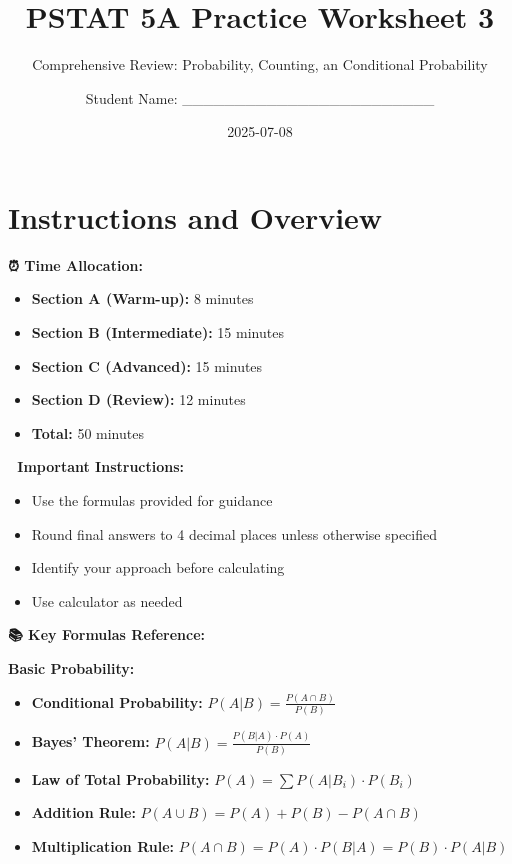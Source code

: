 \documentclass[
  11pt,
]{article}
\title{PSTAT 5A Practice Worksheet 3}
\subtitle{Comprehensive Review: Probability, Counting, an Conditional
Probability}
\author{Student Name: \_\_\_\_\_\_\_\_\_\_\_\_\_\_\_\_\_\_\_\_\_\_\_\_}
\date{2025-07-08}
\renewcommand*\contentsname{Table of contents}
\newcommand\contentsname{Table of contents}
\begin{document}
\maketitle

\renewcommand*\contentsname{Table of contents}
{
\hypersetup{linkcolor=}
\setcounter{tocdepth}{3}
\tableofcontents
}

\section{Instructions and Overview}\label{instructions-and-overview}

\textbf{⏰ Time Allocation:}

\begin{itemize}
\item
  \textbf{Section A (Warm-up):} 8 minutes
\item
  \textbf{Section B (Intermediate):} 15 minutes
\item
  \textbf{Section C (Advanced):} 15 minutes
\item
  \textbf{Section D (Review):} 12 minutes
\item
  \textbf{Total:} 50 minutes
\end{itemize}

\textbf{📝 Important Instructions:}

\begin{itemize}
\item
  Use the formulas provided for guidance
\item
  Round final answers to 4 decimal places unless otherwise specified
\item
  Identify your approach before calculating
\item
  Use calculator as needed
\end{itemize}

\textbf{📚 Key Formulas Reference:}

\textbf{Basic Probability:}

\begin{itemize}
\item
  \textbf{Conditional Probability:}
  \(P(A|B) = \frac{P(A \cap B)}{P(B)}\)
\item
  \textbf{Bayes' Theorem:} \(P(A|B) = \frac{P(B|A) \cdot P(A)}{P(B)}\)
\item
  \textbf{Law of Total Probability:}
  \(P(A) = \sum P(A|B_i) \cdot P(B_i)\)
\item
  \textbf{Addition Rule:} \(P(A \cup B) = P(A) + P(B) - P(A \cap B)\)
\item
  \textbf{Multiplication Rule:}
  \(P(A \cap B) = P(A) \cdot P(B|A) = P(B) \cdot P(A|B)\)
\end{itemize}
\end{document}
